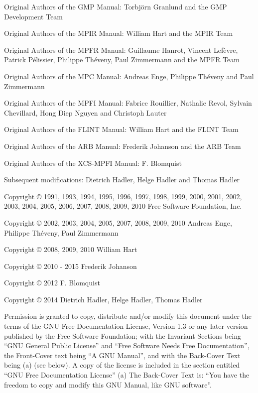 \small
\noindent 
Original Authors of the GMP Manual: Torbj\"orn Granlund and the GMP Development Team

\noindent 
Original Authors of the MPIR Manual: William Hart and the MPIR Team

\noindent 
Original Authors of the MPFR Manual: Guillaume Hanrot, Vincent Lef\`evre, Patrick P\'elissier, Philippe Th\'eveny, Paul Zimmermann and the MPFR Team

\noindent 
Original Authors of the MPC Manual: Andreas Enge, Philippe Th\'eveny and Paul Zimmermann

\noindent 
Original Authors of the MPFI Manual: Fabrice Rouillier, Nathalie Revol, Sylvain Chevillard, Hong Diep Nguyen and Christoph Lauter


\noindent 
Original Authors of the FLINT Manual: William Hart and the FLINT Team

\noindent 
Original Authors of the ARB Manual: Frederik Johanson and the ARB Team

\noindent 
Original Authors of the XCS-MPFI Manual: F. Blomquist

\vspace{1cm}
\noindent 
Subsequent modifications: Dietrich Hadler, Helge Hadler and Thomas Hadler




 \vspace{9cm}


 
\noindent
Copyright \copyright \hspace{0.5mm} 1991, 1993, 1994, 1995, 1996, 1997, 1998, 1999, 2000, 2001, 2002, 2003, 2004, 2005, 2006, 2007, 2008, 2009, 2010 Free Software Foundation, Inc.

\noindent
Copyright \copyright \hspace{0.5mm}  2002, 2003, 2004, 2005, 2007, 2008, 2009, 2010 Andreas Enge, Philippe Th\'eveny, Paul Zimmermann

\noindent
Copyright \copyright \hspace{0.5mm}  2008, 2009, 2010 William Hart

\noindent
Copyright \copyright \hspace{0.5mm}  2010 - 2015 Frederik Johanson

\noindent
Copyright \copyright \hspace{0.5mm}  2012 F. Blomquist

\noindent
Copyright \copyright \hspace{0.5mm}  2014 Dietrich Hadler, Helge Hadler, Thomas Hadler

 \vspace{1cm}

\noindent
Permission is granted to copy, distribute and/or modify this document under the terms of the GNU Free Documentation License, Version 1.3 or any later version published by the Free Software Foundation; with the Invariant Sections being ``GNU General Public License'' and ``Free Software Needs Free Documentation'', the Front-Cover text being ``A GNU Manual'', and with the Back-Cover Text being (a) (see below). A copy of the license is included in the section entitled ``GNU Free Documentation License''
(a) The Back-Cover Text is: ``You have the freedom to copy and modify this GNU Manual, like GNU software''. 
\normalsize